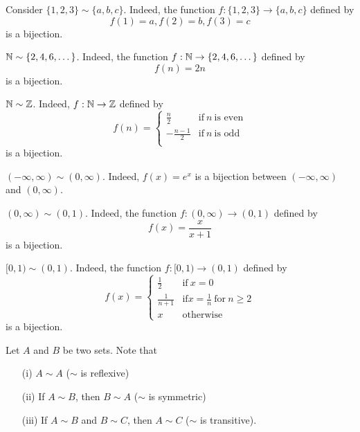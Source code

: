 \documentclass[a4paper]{report}
\begin{document}
\begin{eg}
   Consider \( \{ 1,2,3 \}  \sim \{ a,b,c \}  \). Indeed, the function \( f: \{ 1,2,3 \}  \to \{ a,b,c \}  \) defined by 
   \[ f(1) = a, f(2) = b, f(3) = c  \]
   is a bijection.
\end{eg}

\begin{eg}
    \( \mathbb{N} \sim \{ 2,4,6,\dots \}  \). Indeed, the function \( f: \mathbb{N} \to \{ 2,4,6,\dots \}   \) defined by 
    \[  f(n) = 2n \]
    is a bijection.
\end{eg}

\begin{eg}
    \( \mathbb{N} \sim \mathbb{Z}  \). Indeed, \( f: \mathbb{N} \to \mathbb{Z}  \) defined by
    \[  f(n) = 
    \begin{cases}
        \frac{ n }{ 2 }  &\text{if} \ n \ \text{is even} \\
        -\frac{ n - 1 }{ 2 }  &\text{if} \ n \ \text{is odd} \\
    \end{cases}  \]
    is a bijection.
\end{eg}

\begin{eg}
    \( (-\infty , \infty ) \sim (0,\infty ) \). Indeed, \( f(x) = e^{x}  \) is a bijection between \( (-\infty , \infty ) \) and \( (0,\infty ) \).
\end{eg}

\begin{eg}
    \( (0,\infty ) \sim (0,1) \). Indeed, the function \( f: (0,\infty) \to (0,1) \) defined by 
    \[  f(x) = \frac{ x  }{  x + 1  }  \] is a bijection.
\end{eg}

\begin{eg}
    \( [0,1) \sim (0,1) \). Indeed, the function \( f: [0,1) \to (0,1) \) defined by
    \[  f(x) = 
    \begin{cases}
        \frac{ 1 }{ 2 }  &\text{if} \ x = 0 \\ 
        \frac{ 1 }{ n+1 }  &\text{if} x = \frac{ 1 }{ n }  \ \text{for} \ n \geq 2 \\
        x &\text{otherwise}
    \end{cases}  \]
    is a bijection.
\end{eg}

\begin{definition}
    Let \(  A  \) and \( B  \) be two sets. Note that 
    \begin{enumerate}
        \item[(i)] \( A \sim A \) (\( \sim  \) is reflexive) 
        \item[(ii)] If \( A \sim B  \), then \( B \sim A  \) (\( \sim  \) is symmetric) 
        \item[(iii)] If \( A \sim B  \) and \( B \sim C  \), then \( A \sim C  \) (\( \sim  \) is transitive).
    \end{enumerate}
\end{definition}
\end{document}
